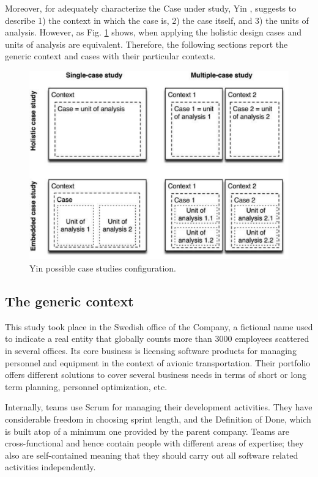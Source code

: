 Moreover, for adequately characterize the Case under study, Yin \cite{case_study_guide}, suggests to describe 1) the context in which the case is, 2) the case itself, and 3) the units of analysis. However, as Fig. \ref{fig:case-study-types} shows, when applying the holistic design cases and units of analysis are equivalent. Therefore, the following sections report the generic context and cases with their particular contexts.

\begin{figure}[hbt]
    \centering
    \includegraphics[width=\textwidth]{figure/yin-case-studies.pdf}
    \caption{Yin \cite{case_study_guide} possible case studies configuration.}
    \label{fig:case-study-types}
\end{figure}


\subsection{The generic context}

This study took place in the Swedish office of the Company, a fictional name used to indicate a real entity that globally counts more than 3000 employees scattered in several offices. Its core business is licensing software products for managing personnel and equipment in the context of avionic transportation. Their portfolio offers different solutions to cover several business needs in terms of short or long term planning, personnel optimization, etc.

Internally, teams use Scrum for managing their development activities. They have considerable freedom in choosing sprint length, and the Definition of Done, which is built atop of a minimum one provided by the parent company. Teams are cross-functional and hence contain people with different areas of expertise; they also are self-contained meaning that they should carry out all software related activities independently.

